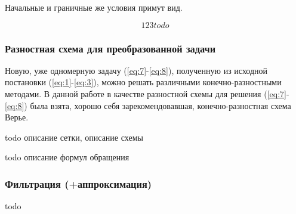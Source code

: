 Начальные и граничные же условия примут вид.

\begin{equation}
\label{eq:8}
123 todo
\end{equation}

\subsubsection{Разностная схема для преобразованной задачи}
Новую, уже одномерную задачу (\ref{eq:7}-\ref{eq:8}), полученную из исходной постановки (\ref{eq:1}-\ref{eq:3}),
можно решать различными конечно-разностными методами. В данной работе в качестве разностной схемы для решения (\ref{eq:7}-\ref{eq:8})
была взята, хорошо себя зарекомендовавшая, конечно-разностная схема Верье.

todo описание сетки, описание схемы

todo описание формул обращения

\subsubsection{Фильтрация (+аппроксимация)}
todo

\clearpage